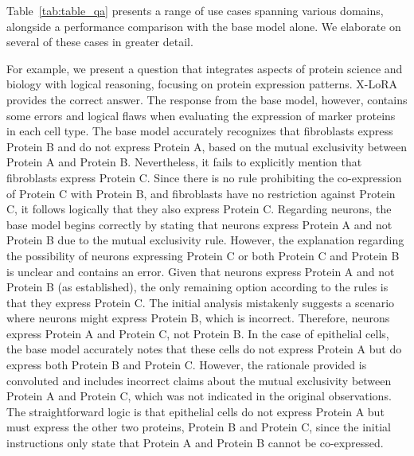 Table~\ref{tab:table_qa} presents a range of use cases spanning various domains, alongside a performance comparison with the base model alone. We elaborate on several of these cases in greater detail.

For example, we present a question that integrates aspects of protein science and biology with logical reasoning, focusing on protein expression patterns. X-LoRA provides the correct answer. The response from the base model, however, contains some errors and logical flaws when evaluating the expression of marker proteins in each cell type. The base model accurately recognizes that fibroblasts express Protein B and do not express Protein A, based on the mutual exclusivity between Protein A and Protein B. Nevertheless, it fails to explicitly mention that fibroblasts express Protein C. Since there is no rule prohibiting the co-expression of Protein C with Protein B, and fibroblasts have no restriction against Protein C, it follows logically that they also express Protein C. Regarding neurons, the base model begins correctly by stating that neurons express Protein A and not Protein B due to the mutual exclusivity rule. However, the explanation regarding the possibility of neurons expressing Protein C or both Protein C and Protein B is unclear and contains an error. Given that neurons express Protein A and not Protein B (as established), the only remaining option according to the rules is that they express Protein C. The initial analysis mistakenly suggests a scenario where neurons might express Protein B, which is incorrect. Therefore, neurons express Protein A and Protein C, not Protein B. In the case of epithelial cells, the base model accurately notes that these cells do not express Protein A but do express both Protein B and Protein C. However, the rationale provided is convoluted and includes incorrect claims about the mutual exclusivity between Protein A and Protein C, which was not indicated in the original observations. The straightforward logic is that epithelial cells do not express Protein A but must express the other two proteins, Protein B and Protein C, since the initial instructions only state that Protein A and Protein B cannot be co-expressed.

